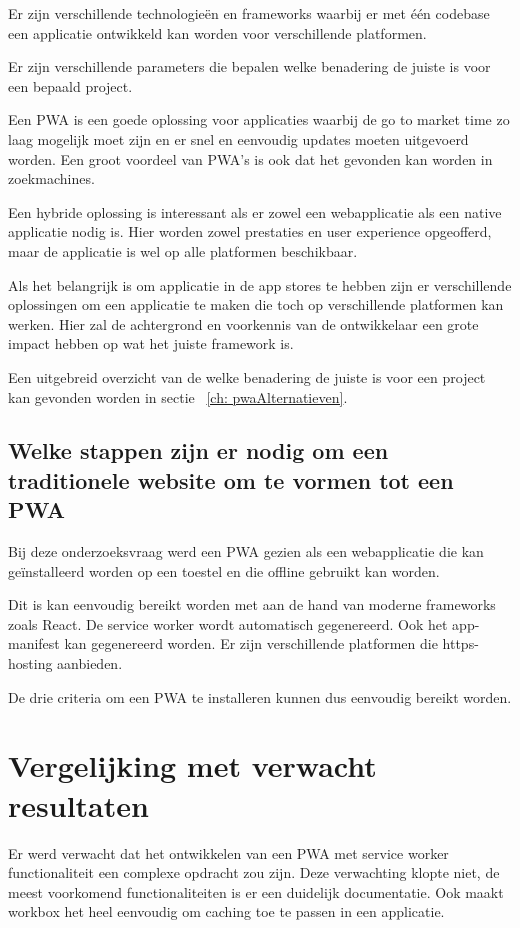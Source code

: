 		Er zijn verschillende technologieën en frameworks waarbij er met één codebase een applicatie ontwikkeld kan worden voor verschillende platformen. 
		
		Er zijn verschillende parameters die bepalen welke benadering de juiste is voor een bepaald project. 
	
		Een PWA is een goede oplossing voor applicaties waarbij de go to market time zo laag mogelijk moet zijn en er snel en eenvoudig updates moeten uitgevoerd worden. Een groot voordeel van PWA's is ook dat het gevonden kan worden in zoekmachines.
		
		Een hybride oplossing is interessant als er zowel een webapplicatie als een native applicatie nodig is. Hier worden zowel prestaties en user experience opgeofferd, maar de applicatie is wel op alle platformen beschikbaar. 
		
		Als het belangrijk is om applicatie in de app stores te hebben zijn er verschillende oplossingen om een applicatie te maken die toch op verschillende platformen kan werken. Hier zal de achtergrond en voorkennis van de ontwikkelaar een grote impact hebben op wat het juiste framework is.
		
		Een uitgebreid overzicht van de welke benadering de juiste is voor een project kan gevonden worden in sectie ~\ref{ch: pwaAlternatieven}.
	
	\subsection{Welke stappen zijn er nodig om een traditionele website om te vormen tot een PWA}
		
		Bij deze onderzoeksvraag werd een PWA gezien als een webapplicatie die kan geïnstalleerd worden op een toestel en die offline gebruikt kan worden.
		
		Dit is kan eenvoudig bereikt worden met aan de hand van moderne frameworks zoals React. De service worker wordt automatisch gegenereerd. Ook het app-manifest kan gegenereerd worden. Er zijn verschillende platformen die https-hosting aanbieden. 
		
		De drie criteria om een PWA te installeren kunnen dus eenvoudig bereikt worden.
	
\section{Vergelijking met verwacht resultaten}
	Er werd verwacht dat het ontwikkelen van een PWA met service worker functionaliteit een complexe opdracht zou zijn.
	Deze verwachting klopte niet, de meest voorkomend functionaliteiten is er een duidelijk documentatie. Ook maakt workbox het heel eenvoudig om caching toe te passen in een applicatie.
	
